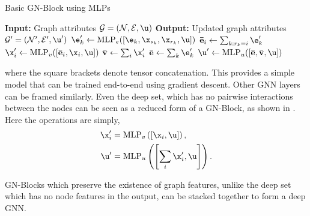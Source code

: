 \begin{algorithm}
    \caption{Basic GN-Block using MLPs}
    \label{alg:gn_block}
    \begin{algorithmic}[1]
        \State \textbf{Input:} Graph attributes $\mathcal{G} = (\mathcal{N}, \mathcal{E}, \u)$
        \State \textbf{Output:} Updated graph attributes $\mathcal{G}' = (\mathcal{N}', \mathcal{E}', \u')$
            \State $\e_k' \gets \text{MLP}_e([\e_k, \x_{s_k}, \x_{r_k}, \u])$ 
        \EndFor
            \State $\mathbf{\bar{e}}_i \gets \sum_{k: r_k = i} \e_k'$ 
            \State $\x_i' \gets \text{MLP}_v([\mathbf{\bar{e}}_i, \x_i, \u])$ 
        \EndFor
        \State $\mathbf{\bar{v}} \gets \sum_{i} \x_i'$ 
        \State $\mathbf{\bar{e}} \gets \sum_{k} \e_k'$
        \State $\u' \gets \text{MLP}_u([\mathbf{\bar{e}}, \mathbf{\bar{v}}, \u])$ 
    \end{algorithmic}
\end{algorithm}

where the square brackets denote tensor concatenation.
This provides a simple model that can be trained end-to-end using gradient descent.
Other GNN layers can be framed similarly.
Even the deep set, which has no pairwise interactions between the nodes can be seen as a reduced form of a GN-Block, as shown in .
Here the operations are simply,
\begin{align}
    \x_i' &= \text{MLP}_v\left(\left[\x_i, \u\right]\right),\\
    \u' &= \text{MLP}_u\left(\left[\sum_{i} \x_i', \u\right]\right).
\end{align}

GN-Blocks which preserve the existence of graph features, unlike the deep set which has no node features in the output, can be stacked together to form a deep GNN.

